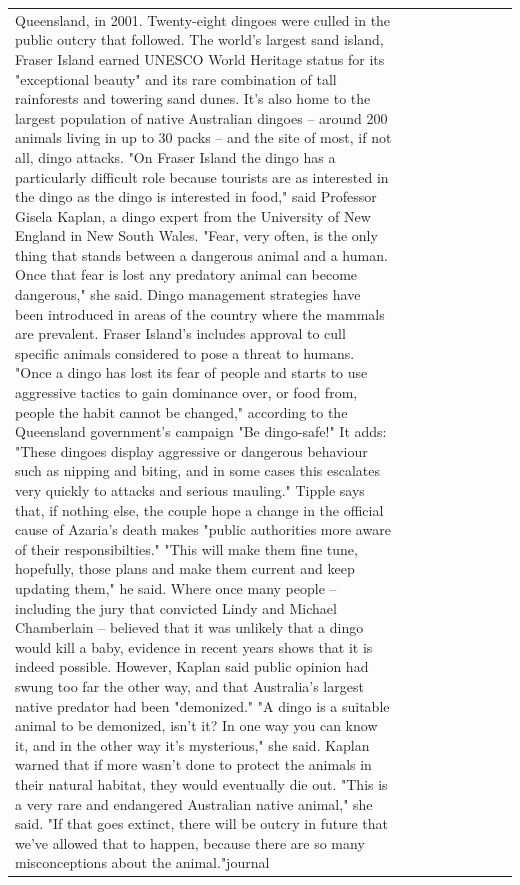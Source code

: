 \begin{table}[H]
\begin{tabular}{lllrlllll}
Queensland, in 2001. Twenty-eight dingoes were culled in the public outcry that followed. The world's largest sand island, Fraser Island earned UNESCO World Heritage status for its "exceptional beauty" and its rare combination of tall rainforests and towering sand dunes. It's also home to the largest population of native Australian dingoes -- around 200 animals living in up to 30 packs -- and the site of most, if not all, dingo attacks. "On Fraser Island the dingo has a particularly difficult role because tourists are as interested in the dingo as the dingo is interested in food," said Professor Gisela Kaplan, a dingo expert from the University of New England in New South Wales. "Fear, very often, is the only thing that stands between a dangerous animal and a human. Once that fear is lost any predatory animal can become dangerous," she said. Dingo management strategies have been introduced in areas of the country where the mammals are prevalent. Fraser Island's includes approval to cull specific animals considered to pose a threat to humans. "Once a dingo has lost its fear of people and starts to use aggressive tactics to gain dominance over, or food from, people the habit cannot be changed," according to the Queensland government's campaign "Be dingo-safe!" It adds: "These dingoes display aggressive or dangerous behaviour such as nipping and biting, and in some cases this escalates very quickly to attacks and serious mauling." Tipple says that, if nothing else, the couple hope a change in the official cause of Azaria's death makes "public authorities more aware of their responsibilties." "This will make them fine tune, hopefully, those plans and make them current and keep updating them," he said. Where once many people -- including the jury that convicted Lindy and Michael Chamberlain -- believed that it was unlikely that a dingo would kill a baby, evidence in recent years shows that it is indeed possible. However, Kaplan said public opinion had swung too far the other way, and that Australia's largest native predator had been "demonized." "A dingo is a suitable animal to be demonized, isn't it? In one way you can know it, and in the other way it's mysterious," she said. Kaplan warned that if more wasn't done to protect the animals in their natural habitat, they would eventually die out. "This is a very rare and endangered Australian native animal," she said. "If that goes extinct, there will be outcry in future that we've allowed that to happen, because there are so many misconceptions about the animal."journal \\

\end{tabular}
\end{table}
